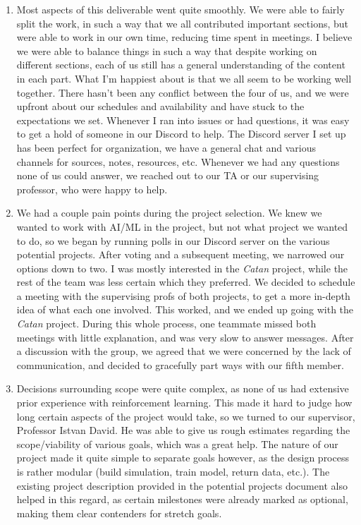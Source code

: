 \documentclass{article}
\begin{document}
\begin{enumerate}
    \item
        Most aspects of this deliverable went quite smoothly.
        We were able to fairly split the work, in such a way that we all contributed important sections, but were able to work in our own time, reducing time spent in meetings.
        I believe we were able to balance things in such a way that despite working on different sections, each of us still has a general understanding of the content in each part.
        What I'm happiest about is that we all seem to be working well together.
        There hasn't been any conflict between the four of us, and we were upfront about our schedules and availability and have stuck to the expectations we set.
        Whenever I ran into issues or had questions, it was easy to get a hold of someone in our Discord to help.
        The Discord server I set up has been perfect for organization, we have a general chat and various channels for sources, notes, resources, etc.
        Whenever we had any questions none of us could answer, we reached out to our TA or our supervising professor, who were happy to help.

    \item
        We had a couple pain points during the project selection.
        We knew we wanted to work with AI/ML in the project, but not what project we wanted to do, so we began by running polls in our Discord server on the various potential projects.
        After voting and a subsequent meeting, we narrowed our options down to two.
        I was mostly interested in the \emph{Catan} project, while the rest of the team was less certain which they preferred.
        We decided to schedule a meeting with the supervising profs of both projects, to get a more in-depth idea of what each one involved.
        This worked, and we ended up going with the \emph{Catan} project.
        During this whole process, one teammate missed both meetings with little explanation, and was very slow to answer messages.
        After a discussion with the group, we agreed that we were concerned by the lack of communication, and decided to gracefully part ways with our fifth member.

    \item
        Decisions surrounding scope were quite complex, as none of us had extensive prior experience with reinforcement learning.
        This made it hard to judge how long certain aspects of the project would take, so we turned to our supervisor, Professor Istvan David.
        He was able to give us rough estimates regarding the scope/viability of various goals, which was a great help.
        The nature of our project made it quite simple to separate goals however, as the design process is rather modular (build simulation, train model, return data, etc.).
        The existing project description provided in the potential projects document also helped in this regard, as certain milestones were already marked as optional, making them clear contenders for stretch goals.
\end{enumerate}
\end{document}
